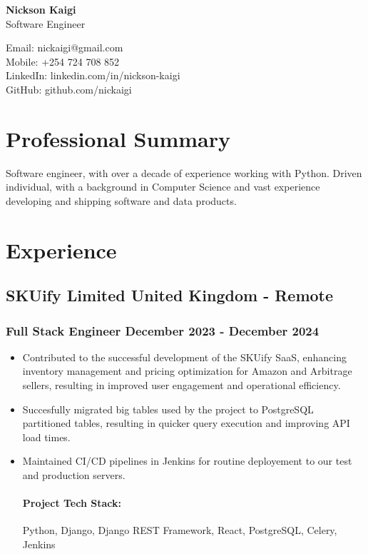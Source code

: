 \documentclass[11pt]{article} %
\begin{document}
\begin{center}
    \begin{minipage}{0.5\textwidth}
    {\Huge\bfseries
        Nickson Kaigi
        } \\ \medskip
        Software Engineer
    \end{minipage} \hfill
    \begin{minipage}{0.4\textwidth}
        \raggedleft
        Email: nickaigi@gmail.com \\
        Mobile: +254 724 708 852 \\
        LinkedIn: linkedin.com/in/nickson-kaigi \\
        GitHub: github.com/nickaigi
    \end{minipage}
\end{center}

\section{Professional Summary}
Software engineer, with over a decade of experience working with Python. Driven individual, with a background in Computer Science and vast experience developing and shipping software and data products.

\section{Experience}
\subsection{SKUify Limited \hfill United Kingdom - Remote}
\subsubsection{Full Stack Engineer \hfill  December 2023 - December 2024}
\begin{itemize}
    \item Contributed to the successful development of the SKUify SaaS, enhancing inventory management and pricing optimization for Amazon and Arbitrage sellers, resulting in improved user engagement and operational efficiency.
    \item Succesfully migrated big tables used by the project to PostgreSQL partitioned tables, resulting in quicker query execution and improving API load times.
    \item Maintained CI/CD pipelines in Jenkins for routine deployement to our test and production servers.

    \paragraph{Project Tech Stack:} Python, Django, Django REST Framework, React, PostgreSQL, Celery, Jenkins
\end{itemize}
\end{document}
